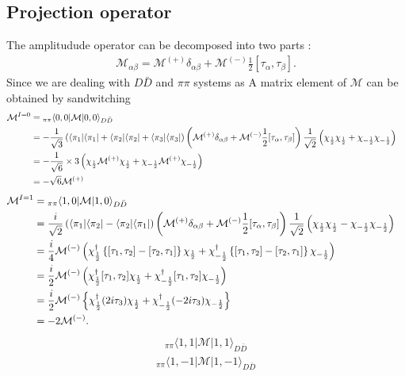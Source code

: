 \documentclass[aps,prd,preprintnumbers,showpacs,showkeys,nofootinbib,
superscriptaddress,fleqn,floatfix,tightenlines, 10pt]{revtex4-1}
\begin{document}
\subsection{Projection operator}
The amplitudude operator can be decomposed into two parts :
\begin{align}
	\mathcal{M}_{\alpha \beta} = \mathcal{M}^{(+)}\delta_{\alpha \beta} + \mathcal{M}^{(-)} \frac{1}{2} [\tau_\alpha,\tau_\beta].
\end{align}
Since we are dealing with $D\bar{D}$ and $\pi\pi$ systems as
A matrix element of $\mathcal{M}$ can be obtained by sandwitching
\begin{align}
	\mathcal{M}^{I=0} &= {}_{\pi\pi}\langle 0,0| \mathcal{M} | 0,0 \rangle_{D\bar{D}} \cr
	&= -\frac{1}{\sqrt{3}} \left(\langle\pi_1| \langle\pi_1| + \langle\pi_2| \langle\pi_2|
	+\langle\pi_3| \langle\pi_3| \right)
	\left(\mathcal{M}^{(+)}\delta_{\alpha \beta} + \mathcal{M}^{(-)} \frac{1}{2} [\tau_\alpha,\tau_\beta]\right)
	\frac{1}{\sqrt{2}} \left(\chi_{\frac{1}{2}}\chi_{\frac{1}{2}} + \chi_{-\frac{1}{2}}\chi_{-\frac{1}{2}} \right) \cr
	&= -\frac{1}{\sqrt{6}} \times 3 \left(\chi_{\frac{1}{2}} \mathcal{M}^{(+)} \chi_{\frac{1}{2}}
	+\chi_{-\frac{1}{2}} \mathcal{M}^{(+)} \chi_{-\frac{1}{2}} \right) \cr
	&= -\sqrt{6} \mathcal{M}^{(+)}
\end{align}
\begin{align}
	\mathcal{M}^{I=1} &= {}_{\pi\pi}\langle 1,0|\mathcal{M} | 1,0 \rangle_{D\bar{D}} \cr
	&= \frac{i}{\sqrt{2}} \left( \langle\pi_1| \langle\pi_2| -\langle\pi_2| \langle\pi_1|\right)
	\left(\mathcal{M}^{(+)}\delta_{\alpha \beta} + \mathcal{M}^{(-)} \frac{1}{2} [\tau_\alpha,\tau_\beta]\right)
	\frac{1}{\sqrt{2}} \left(\chi_{\frac{1}{2}}\chi_{\frac{1}{2}} - \chi_{-\frac{1}{2}}\chi_{-\frac{1}{2}} \right) \cr
	&= \frac{i}{4} \mathcal{M}^{(-)} \left(\chi_{\frac{1}{2}}^\dagger \left\{[\tau_1,\tau_2]-[\tau_2,\tau_1]\right\}\chi_{\frac{1}{2}} +
	\chi_{-\frac{1}{2}}^\dagger \left\{[\tau_1,\tau_2]-[\tau_2,\tau_1]\right\} \chi_{-\frac{1}{2}}   \right) \cr
	&= \frac{i}{2} \mathcal{M}^{(-)} \left(\chi_{\frac{1}{2}}^\dagger [\tau_1,\tau_2]\chi_{\frac{1}{2}} +
	\chi_{-\frac{1}{2}}^\dagger [\tau_1,\tau_2] \chi_{-\frac{1}{2}}   \right)\cr
	&= \frac{i}{2} \mathcal{M}^{(-)} \left\{\chi_{\frac{1}{2}}^\dagger (2i\tau_3)\chi_{\frac{1}{2}} +
	\chi_{-\frac{1}{2}}^\dagger (-2i\tau_3) \chi_{-\frac{1}{2}}   \right\} \cr
	&= -2\mathcal{M}^{(-)}.
\end{align}
\begin{align}
	{}_{\pi\pi}\langle 1,1|\mathcal{M} | 1,1 \rangle_{D\bar{D}}
\end{align}
\begin{align}
	{}_{\pi\pi}\langle 1,-1|\mathcal{M} | 1,-1 \rangle_{D\bar{D}}
\end{align}
\end{document}
